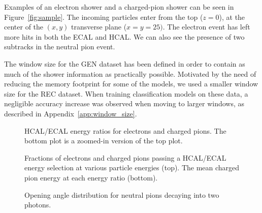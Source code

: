 
Examples of an electron shower and a charged-pion shower can be seen in Figure~\ref{fig:sample}. The incoming particles enter from the top ($z=0$), at the center of the $(x,y)$ transverse plane ($x=y=25)$. The electron event has left more hits in both the ECAL and HCAL. We can also see the presence of two subtracks in the neutral pion event. %

The window size for the GEN dataset has been defined in order to contain as much of the shower information as practically possible.  
Motivated by the need of reducing the memory footprint for some of the models, we used a smaller window size for the REC dataset. When training classification models on these data, a negligible accuracy increase was observed when moving to larger windows, as described in Appendix~\ref{app:window_size}.

\begin{figure*}[htbp]
\centering
\caption{3D image of a photon (top) and neutral pion (bottom) shower in ECAL (left) and HCAL (right).}
\label{fig:sample}
\end{figure*}


\begin{figure}[htbp]
\centering
\caption{HCAL/ECAL energy ratios for electrons and charged pions. The bottom plot is a zoomed-in version of the top plot.}
\label{fig:HE_ratio}
\end{figure}

\begin{figure}[htbp]
\centering
\caption{Fractions of electrons and charged pions passing a HCAL/ECAL energy selection at various particle energies (top). The mean charged pion energy at each energy ratio (bottom).}
\label{fig:HE_ratio_energy}
\end{figure}

\begin{figure}[htbp]
\centering
\caption{Opening angle distribution for neutral pions decaying into two photons.}
\label{fig:opening_angle}
\end{figure}

